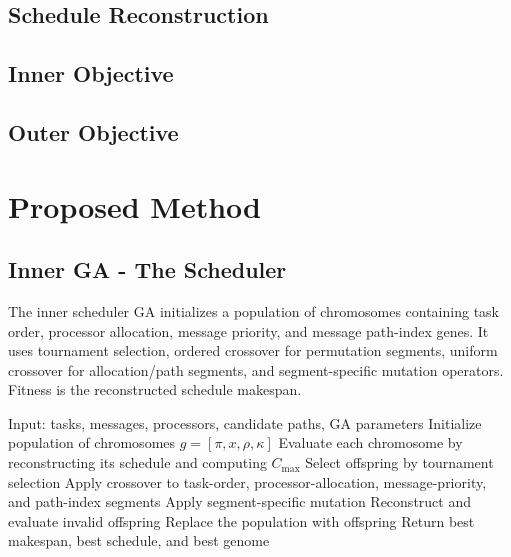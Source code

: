 \documentclass{ieeeaccess}
\begin{document}
\subsection{Schedule Reconstruction}



\subsection{Inner Objective}



\subsection{Outer Objective}



\section{Proposed Method}
\label{sec:proposed_method}

\subsection{Inner GA - The Scheduler}

The inner scheduler GA initializes a population of chromosomes containing task order, processor allocation, message priority, and message path-index genes. It uses tournament selection, ordered crossover for permutation segments, uniform crossover for allocation/path segments, and segment-specific mutation operators. Fitness is the reconstructed schedule makespan.

\begin{algorithm}[t]
\caption{Inner Scheduler GA}
\label{alg:inner_ga}
\begin{algorithmic}[1]
\STATE Input: tasks, messages, processors, candidate paths, GA parameters
\STATE Initialize population of chromosomes \(g=[\pi,x,\rho,\kappa]\)
\STATE Evaluate each chromosome by reconstructing its schedule and computing \(C_{\max}\)
    \STATE Select offspring by tournament selection
    \STATE Apply crossover to task-order, processor-allocation, message-priority, and path-index segments
    \STATE Apply segment-specific mutation
    \STATE Reconstruct and evaluate invalid offspring
    \STATE Replace the population with offspring
\ENDFOR
\STATE Return best makespan, best schedule, and best genome
\end{algorithmic}
\end{algorithm}
\end{document}
